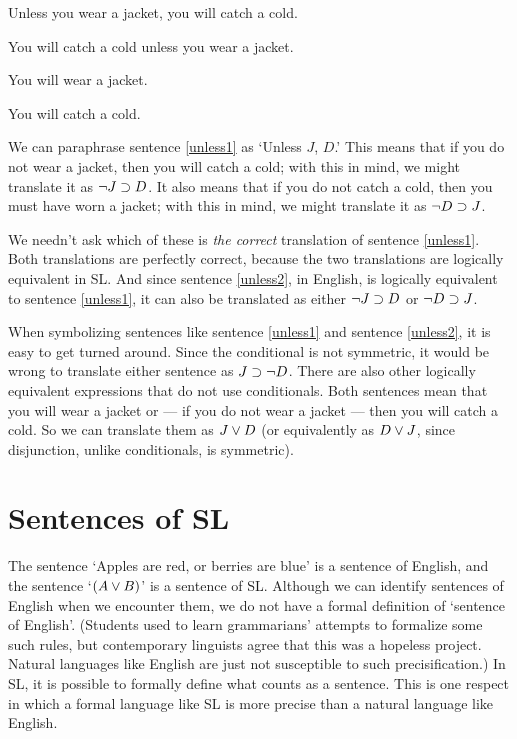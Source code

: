 \begin{earg}
\item[\ex{unless1}] Unless you wear a jacket, you will catch a cold. 
\item[\ex{unless2}] You will catch a cold unless you wear a jacket. 
\end{earg}


\begin{ekey}
\item[J:] You will wear a jacket.
\item[D:] You will catch a cold.
\end{ekey}

We can paraphrase sentence \ref{unless1} as `Unless $J$, $D$.' This means that if you do not wear a jacket, then you will catch a cold; with this in mind, we might translate it as $\neg J \supset D$. It also means that if you do not catch a cold, then you must have worn a jacket; with this in mind, we might translate it as $\neg D \supset J$.

We needn't ask which of these is \emph{the correct} translation of sentence \ref{unless1}. Both translations are perfectly correct, because the two translations are logically equivalent in SL. And since sentence \ref{unless2}, in English, is logically equivalent to sentence \ref{unless1}, it can also be translated as either $\neg J \supset D$ or $\neg D \supset J$.

When symbolizing sentences like sentence \ref{unless1} and sentence \ref{unless2}, it is easy to get turned around. Since the conditional is not symmetric, it would be wrong to translate either sentence as $J \supset \neg D$. There are also other logically equivalent expressions that do not use conditionals. Both sentences mean that you will wear a jacket or --- if you do not wear a jacket --- then you will catch a cold. So we can translate them as $J \vee D$ (or equivalently as $D \vee J$, since disjunction, unlike conditionals, is symmetric).





\section{Sentences of SL}
\label{sec:sentencesofSL}
The sentence `Apples are red, or berries are blue' is a sentence of English, and the sentence `$(A\vee B)$' is a sentence of SL. Although we can identify sentences of English when we encounter them, we do not have a formal definition of `sentence of English'. (Students used to learn grammarians' attempts to formalize some such rules, but contemporary linguists agree that this was a hopeless project. Natural languages like English are just not susceptible to such precisification.) In SL, it is possible to formally define what counts as a sentence. This is one respect in which a formal language like SL is more precise than a natural language like English.


